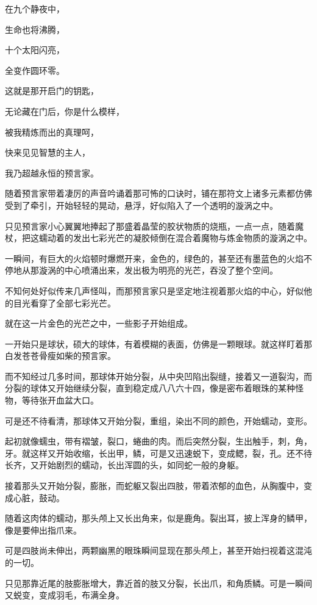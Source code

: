 \documentclass[UTF8]{article}
\begin{document}
\par 在九个静夜中，
\par 生命也将沸腾，
\par 十个太阳闪亮，
\par 全变作圆环零。
\par 这就是那开启门的钥匙，
\par 无论藏在门后，你是什么模样，
\par 被我精炼而出的真理呵，
\par 快来见见智慧的主人，
\par 我乃超越永恒的预言家。
\\[0.6cm]
\par 随着预言家带着凄厉的声音吟诵着那可怖的口诀时，铺在那符文上诸多元素都仿佛受到了牵引，开始轻轻的晃动，悬浮，好似陷入了一个透明的漩涡之中。
\par 只见预言家小心翼翼地捧起了那盛着晶莹的胶状物质的烧瓶，一点一点，随着魔杖，把这蠕动着的发出七彩光芒的凝胶倾倒在混合着魔物与炼金物质的漩涡之中。
\par 一瞬间，有巨大的火焰顿时爆燃开来，金色的，绿色的，甚至还有墨蓝色的火焰不停地从那漩涡的中心喷涌出来，发出极为明亮的光芒，吞没了整个空间。
\\[0.6cm]
\par 不知何处好似传来几声怪叫，而那预言家只是坚定地注视着那火焰的中心，好似他的目光看穿了全部七彩光芒。
\par 就在这一片金色的光芒之中，一些影子开始组成。
\par 一开始只是球状，硕大的球体，有着模糊的表面，仿佛是一颗眼球。就这样盯着那白发苍苍骨瘦如柴的预言家。
\par 而不知经过几多时间，那球体开始分裂，从中央凹陷出裂缝，接着又一道裂沟，而分裂的球体又开始继续分裂，直到稳定成八八六十四，像是密布着眼珠的某种怪物，等待张开血盆大口。
\par 可是还不待看清，那球体又开始分裂，重组，染出不同的颜色，开始蠕动，变形。
\par 起初就像蠕虫，带有褶皱，裂口，蜷曲的肉。而后突然分裂，生出触手，刺，角，牙。就这样又开始收缩，长出甲，鳞，可是又迅速蜕下，变成鳃，裂，孔。还不待长齐，又开始剧烈的蠕动，长出浑圆的头，如同蛇一般的身躯。
\par 接着那头又开始分裂，膨胀，而蛇躯又裂出四肢，带着浓郁的血色，从胸腹中，变成心脏，鼓动。
\par 随着这肉体的蠕动，那头颅上又长出角来，似是鹿角。裂出耳，披上浑身的鳞甲，像是要伸出指爪来。
\par 可是四肢尚未伸出，两颗幽黑的眼珠瞬间显现在那头颅上，甚至开始扫视着这混沌的一切。
\par 只见那靠近尾的肢膨胀增大，靠近首的肢又分裂，长出爪，和角质鳞。可是一瞬间又蜕变，变成羽毛，布满全身。
\end{document}
